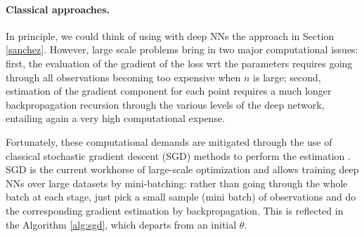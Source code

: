 


\paragraph{Classical approaches.}

In principle, we could think of using 
with deep NNs the approach in Section \ref{sanchez}. However,
 large scale problems bring in two major
computational issues: first, the 
evaluation of the gradient of the loss wrt the parameters
requires going through all observations
 becoming too expensive when $n$ is large;
second, estimation of the gradient component
for each point requires a much longer backpropagation recursion through the various levels of the
deep network, 
entailing again a very high computational 
expense. 

Fortunately, these computational demands are mitigated
through the use of classical stochastic gradient descent
(SGD)
methods \parencite{robbins}
to perform the estimation \parencite{bottou2010large}. SGD is the current workhorse of large-scale optimization and 
allows training deep NNs over large datasets by mini-batching: rather than going through the whole batch at each stage, just pick a small sample
(mini batch) of observations and do the corresponding
gradient estimation by backpropagation. This is reflected in the Algorithm \ref{alg:sgd}, which departs from an
initial $\theta$.


